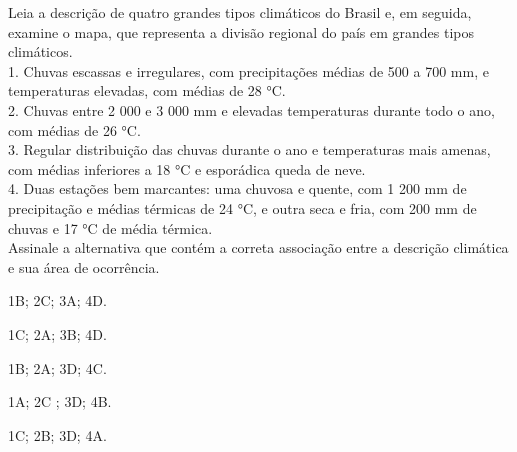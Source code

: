 \questao
Leia a descrição de quatro grandes tipos climáticos do Brasil e, em seguida, examine o mapa, que representa a divisão regional do país em grandes tipos climáticos.\\
1. Chuvas escassas e irregulares, com precipitações médias de 500 a 700 mm, e temperaturas elevadas, com médias de 28 °C.\\
2. Chuvas entre 2 000 e 3 000 mm e elevadas temperaturas durante todo o ano, com médias de 26 °C.\\
3. Regular distribuição das chuvas durante o ano e temperaturas mais amenas, com médias inferiores a 18 °C e esporádica queda de neve.\\
4. Duas estações bem marcantes: uma chuvosa e quente, com 1 200 mm de precipitação e médias térmicas de 24 °C, e outra seca e fria, com 200 mm de chuvas e 17 °C de média térmica.\\
Assinale a alternativa que contém a correta associação entre a descrição climática e sua área de ocorrência.
\begin{alternativas}
\item 1B; 2C; 3A; 4D.   
\item 1C; 2A; 3B; 4D.   
\item 1B; 2A; 3D; 4C.   
\item 1A; 2C ; 3D; 4B.
\item 1C; 2B; 3D; 4A.
\end{alternativas}

